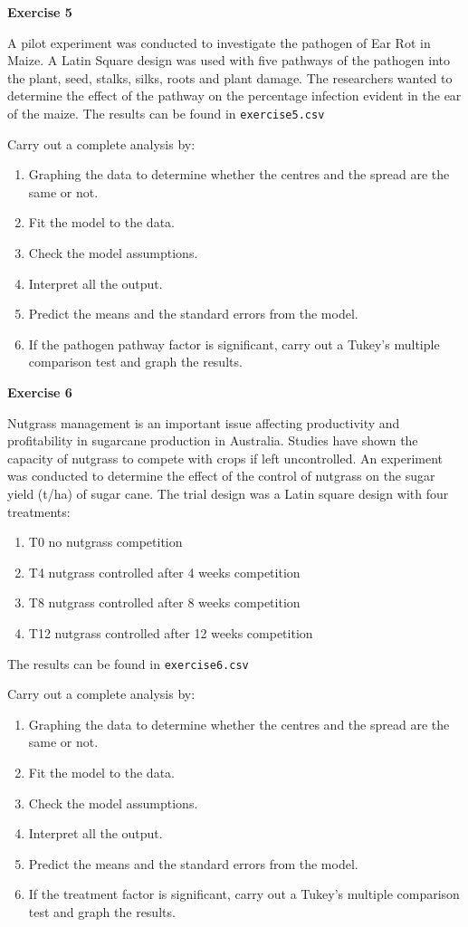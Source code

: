\documentclass[a4paper, 10pt, fleqn, twosided]{memoir}
\begin{document}
\textbf{Exercise 5}

A pilot experiment was conducted to investigate the pathogen of Ear Rot in Maize. A Latin Square design was used with
five pathways of the pathogen into the plant, seed, stalks, silks, roots and plant damage. The researchers wanted to
determine the effect of the pathway on the percentage infection evident in the ear of the maize. The results can be
found in \texttt{exercise5.csv}


Carry out a complete analysis by:
\begin{enumerate}
  \item Graphing the data to determine whether the centres and the spread are the same or not.
  \item Fit the model to the data.
  \item Check the model assumptions.
  \item Interpret all the output.
  \item Predict the means and the standard errors from the model.
  \item If the pathogen pathway factor is significant, carry out a Tukey's multiple comparison test and graph the
      results.
\end{enumerate}


\textbf{Exercise 6}

Nutgrass management is an important issue affecting productivity and profitability in sugarcane production in
Australia. Studies have shown the capacity of nutgrass to compete with crops if left uncontrolled. An experiment was
conducted to determine the effect of the control of nutgrass on the sugar yield  (t/ha) of sugar cane. The trial design
was a Latin square design with four treatments:
\begin{enumerate}
\item T0 no nutgrass competition
\item T4 nutgrass controlled after 4 weeks competition
\item T8 nutgrass controlled after 8 weeks competition
\item T12 nutgrass controlled after 12 weeks competition
\end{enumerate}
The results can be found in \texttt{exercise6.csv}


Carry out a complete analysis by:
\begin{enumerate}
  \item Graphing the data to determine whether the centres and the spread are the same or not.
  \item Fit the model to the data.
  \item Check the model assumptions.
  \item Interpret all the output.
  \item Predict the means and the standard errors from the model.
  \item If the treatment factor is significant, carry out a Tukey's multiple comparison test and graph the results.
\end{enumerate}
\end{document}
